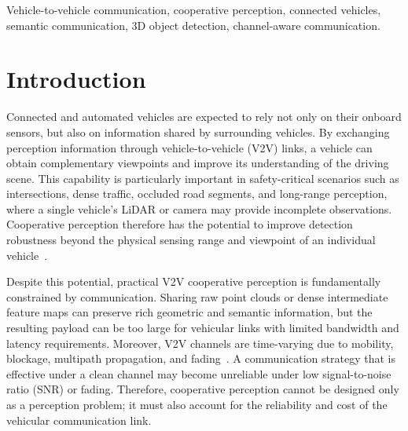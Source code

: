 \documentclass[journal]{IEEEtran}
\begin{document}
\begin{abstract}
$[+0.012,+0.022]$). The deployed selector incurs $52.8$~ms per frame on a single CPU core, fitting the $100$~ms budget of a 10~Hz LiDAR cycle. These results demonstrate that channel-aware semantic granularity adaptation is an effective strategy for bandwidth-constrained V2V cooperative perception.
\end{abstract}

\begin{IEEEkeywords}
Vehicle-to-vehicle communication, cooperative perception, connected vehicles, semantic communication, 3D object detection, channel-aware communication.
\end{IEEEkeywords}

\section{Introduction}

Connected and automated vehicles are expected to rely not only on their onboard sensors, but also on information shared by surrounding vehicles. By exchanging perception information through vehicle-to-vehicle (V2V) links, a vehicle can obtain complementary viewpoints and improve its understanding of the driving scene. This capability is particularly important in safety-critical scenarios such as intersections, dense traffic, occluded road segments, and long-range perception, where a single vehicle's LiDAR or camera may provide incomplete observations. Cooperative perception therefore has the potential to improve detection robustness beyond the physical sensing range and viewpoint of an individual vehicle~\cite{xu2022opv2v,xu2022v2xvit}.

Despite this potential, practical V2V cooperative perception is fundamentally constrained by communication. Sharing raw point clouds or dense intermediate feature maps can preserve rich geometric and semantic information, but the resulting payload can be too large for vehicular links with limited bandwidth and latency requirements. Moreover, V2V channels are time-varying due to mobility, blockage, multipath propagation, and fading~\cite{ieee80211bd,3gpp38885}. A communication strategy that is effective under a clean channel may become unreliable under low signal-to-noise ratio (SNR) or fading. Therefore, cooperative perception cannot be designed only as a perception problem; it must also account for the reliability and cost of the vehicular communication link.
\end{document}
